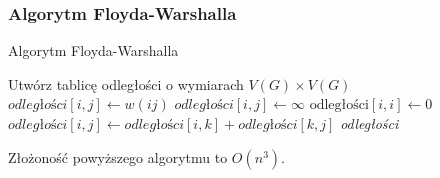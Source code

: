 \subsubsection{Algorytm Floyda-Warshalla}
\begin{algorithm}[H]
	\caption{Algorytm Floyda-Warshalla}
	\begin{algorithmic}[1]
		\State Utwórz tablicę odległości o wymiarach $V(G) \times V(G)$
		\State $\textit{odległości}[i, j] \gets w(ij)$
		\Else
		\State $\textit{odległości}[i, j] \gets \infty$
		\EndIf
		\EndFor
		\EndFor
		\State $\text{odległości}[i, i] \gets 0$
		\EndFor
		\State $\textit{odległości}[i, j] \gets \textit{odległości}[i, k] + \textit{odległości}[k, j]$
		\EndIf
		\EndFor
		\EndFor
		\EndFor
		\State \Return \textit{odległości}
		\EndProcedure
	\end{algorithmic}
	\label{floydWarshall_alg}
\end{algorithm}

Złożoność powyższego algorytmu to $O(n^3)$.


